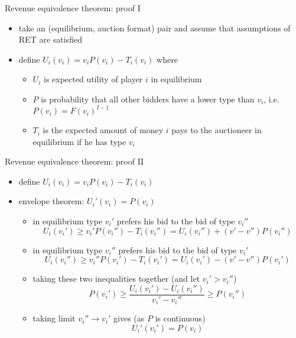 \documentclass[bigger]{beamer}
\begin{document}
\begin{frame}[label={sec:org6fb3b5e}]{Revenue equivalence theorem: proof I}
\begin{itemize}
\item take an (equilibrium, auction format) pair and assume that assumptions of RET are satisfied
\item define \(U_i(v_i)=v_i P(v_i)- T_i(v_i)\) where
\begin{itemize}
\item \(U_i\) is expected utility of player \(i\) in equilibrium
\item \(P\) is probability that all other bidders have a lower type than \(v_i\), i.e. \(P(v_i)=F(v_i)^{I-1}\)
\item \(T_i\) is the expected amount of money \(i\) pays to the auctioneer in equilibrium if he has type \(v_i\)
\end{itemize}
\end{itemize}
\end{frame}
\begin{frame}[label={sec:orgb16cfb4}]{Revenue equivalence theorem: proof II}
\begin{itemize}
\item define \(U_i(v_i)=v_i P(v_i)- T_i(v_i)\)
\item \alert{envelope theorem:} \(U_i'(v_i)=P(v_i)\)
\begin{itemize}
\item in equilibrium type \(v_i'\) prefers his bid to the bid of type \(v_i''\)
$$U_i(v_i')\geq v_i' P(v_i'') -T_i(v_i'')=U_i(v_i'')+(v'-v'')P(v_i'')$$
\item in equilibrium type \(v_i''\) prefers his bid to the bid of type \(v_i'\)
$$U_i(v_i'')\geq v_i'' P(v_i') -T_i(v_i')=U_i(v_i')-(v'-v'')P(v_i')$$
\item taking these two inequalities together (and let \(v_i'>v_i''\))
$$P(v_i')\geq \frac{U_i(v_i')-U_i(v_i'')}{v_i'-v_i''}\geq P(v_i'')$$
\item taking limit \(v_i''\rightarrow v_i'\) gives (as \(P\) is continuous)
$$U_i'(v_i')=P(v_i)$$
\end{itemize}
\end{itemize}
\end{frame}
\end{document}
